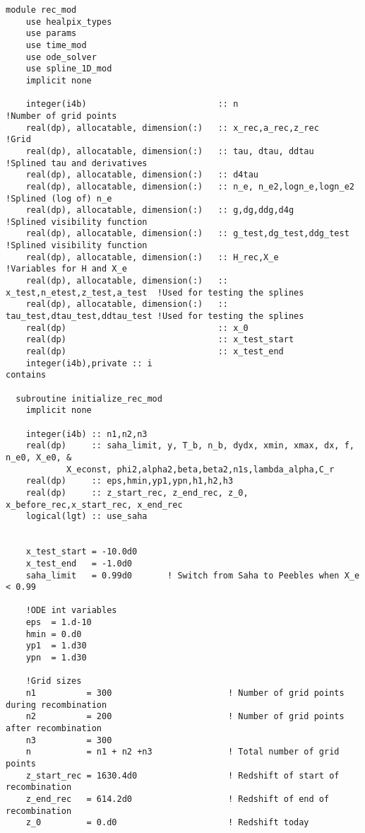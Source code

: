 \documentclass{aa}   %
\begin{document}
\begin{verbatim}
module rec_mod
    use healpix_types
    use params
    use time_mod
    use ode_solver
    use spline_1D_mod
    implicit none

    integer(i4b)                          :: n                             !Number of grid points
    real(dp), allocatable, dimension(:)   :: x_rec,a_rec,z_rec             !Grid
    real(dp), allocatable, dimension(:)   :: tau, dtau, ddtau              !Splined tau and derivatives
    real(dp), allocatable, dimension(:)   :: d4tau
    real(dp), allocatable, dimension(:)   :: n_e, n_e2,logn_e,logn_e2      !Splined (log of) n_e
    real(dp), allocatable, dimension(:)   :: g,dg,ddg,d4g                  !Splined visibility function
    real(dp), allocatable, dimension(:)   :: g_test,dg_test,ddg_test       !Splined visibility function
    real(dp), allocatable, dimension(:)   :: H_rec,X_e                     !Variables for H and X_e
    real(dp), allocatable, dimension(:)   :: x_test,n_etest,z_test,a_test  !Used for testing the splines
    real(dp), allocatable, dimension(:)   :: tau_test,dtau_test,ddtau_test !Used for testing the splines
    real(dp)                              :: x_0
    real(dp)                              :: x_test_start
    real(dp)                              :: x_test_end
    integer(i4b),private :: i
contains

  subroutine initialize_rec_mod
    implicit none
    
    integer(i4b) :: n1,n2,n3
    real(dp)     :: saha_limit, y, T_b, n_b, dydx, xmin, xmax, dx, f, n_e0, X_e0, &
		    X_econst, phi2,alpha2,beta,beta2,n1s,lambda_alpha,C_r
    real(dp)     :: eps,hmin,yp1,ypn,h1,h2,h3
    real(dp)     :: z_start_rec, z_end_rec, z_0, x_before_rec,x_start_rec, x_end_rec
    logical(lgt) :: use_saha


    x_test_start = -10.0d0
    x_test_end   = -1.0d0
    saha_limit   = 0.99d0       ! Switch from Saha to Peebles when X_e < 0.99

    !ODE int variables
    eps  = 1.d-10
    hmin = 0.d0
    yp1  = 1.d30
    ypn  = 1.d30

    !Grid sizes 
    n1          = 300                       ! Number of grid points during recombination
    n2          = 200                       ! Number of grid points after recombination
    n3          = 300
    n           = n1 + n2 +n3               ! Total number of grid points
    z_start_rec = 1630.4d0                  ! Redshift of start of recombination
    z_end_rec   = 614.2d0                   ! Redshift of end of recombination
    z_0         = 0.d0                      ! Redshift today


\end{verbatim}
\end{document}
